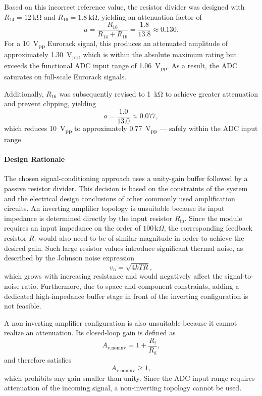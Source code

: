 Based on this incorrect reference value, the resistor divider was designed with 
\(R_{14} = \SI{12}{\kilo\ohm}\) and \(R_{16} = \SI{1.8}{\kilo\ohm}\), yielding an 
attenuation factor of
\[
a = \frac{R_{16}}{R_{14} + R_{16}} = \frac{1.8}{13.8} \approx 0.130.
\]
For a \SI{10}{\volt_{pp}} Eurorack signal, this produces an attenuated amplitude of 
approximately \SI{1.30}{\volt_{pp}}, which is within the absolute maximum rating but 
exceeds the functional ADC input range of \SI{1.06}{\volt_{pp}}. As a result, the ADC 
saturates on full-scale Eurorack signals.

Additionally, \(R_{16}\) was subsequently revised to \SI{1}{\kilo\ohm} to achieve 
greater attenuation and prevent clipping, yielding
\[
a = \frac{1.0}{13.0} \approx 0.077,
\]
which reduces \SI{10}{\volt_{pp}} to approximately \SI{0.77}{\volt_{pp}} — safely 
within the ADC input range. 


\paragraph{Design Rationale}
The chosen signal-conditioning approach uses a unity-gain buffer followed by a passive resistor divider. This decision is based on the constraints of the system and the electrical design conclusions of other commonly used amplification circuits. An inverting amplifier topology is unsuitable because its input impedance is determined directly by the input resistor \(R_\text{in}\). Since the module requires an input impedance on the order of \(100\,\text{k}\Omega\), the corresponding feedback resistor \(R_\text{f}\) would also need to be of similar magnitude in order to achieve the desired gain. Such large resistor values introduce significant thermal noise, as described by the Johnson noise expression
\[
v_\text{n} = \sqrt{4 k T R},
\]
which grows with increasing resistance and would negatively affect the signal-to-noise ratio. Furthermore, due to space and component constraints, adding a dedicated high-impedance buffer stage in front of the inverting configuration is not feasible.

A non-inverting amplifier configuration is also unsuitable because it cannot realize an attenuation. Its closed-loop gain is defined as
\[
A_\text{v,noninv} = 1 + \frac{R_\text{f}}{R_\text{g}},
\]
and therefore satisfies
\[
A_\text{v,noninv} \geq 1,
\]
which prohibits any gain smaller than unity. Since the ADC input range requires attenuation of the incoming signal, a non-inverting topology cannot be used.

